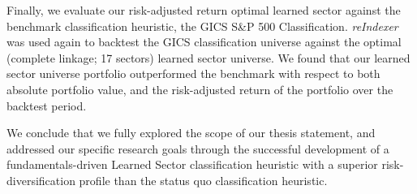 \documentclass[../main.tex]{subfiles}
\begin{document}
Finally, we evaluate our risk-adjusted return optimal learned sector against the benchmark classification heuristic, the GICS S\&P 500 Classification. \textit{reIndexer} was used again to backtest the GICS classification universe against the optimal (complete linkage; 17 sectors) learned sector universe. We found that our learned sector universe portfolio outperformed the benchmark with respect to both absolute portfolio value, and the risk-adjusted return of the portfolio over the backtest period.

We conclude that we fully explored the scope of our thesis statement, and addressed our specific research goals through the successful development of a fundamentals-driven Learned Sector classification heuristic with a superior risk-diversification profile than the status quo classification heuristic.







    
\end{document}

